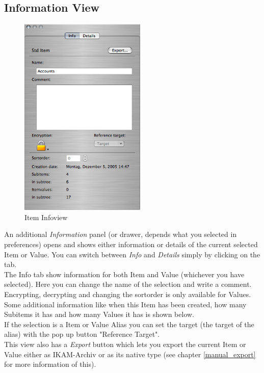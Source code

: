 \documentclass[12pt,a4]{article}
\begin{document}
\subsection{Information View}
\label{gui_information}
\medskip
% 
\begin{figure}[ht]
\begin{center}
\includegraphics[width=6.0cm]{images/Item_InfoView.png}
\end{center}
\caption{Item Infoview}
\label{image:iteminfoview}
\end{figure}
\noindent
%
An additional \textit{Information} panel (or drawer, depends what you selected in preferences) opens and shows either information or details of the current selected Item or Value. You can switch between \textit{Info} and \textit{Details} simply by clicking on the tab. \\
The Info tab show information for both Item and Value (whichever you have selected). Here you can change the name of the selection and write a comment. Encrypting, decrypting and changing the sortorder is only available for Values. \\
Some additional information like when this Item has been created, how many Subitems it has and how many Values it has is shown below. \\
If the selection is a Item or Value Alias you can set the target (the target of the alias) with the pop up button "Reference Target". \\
This view also has a \textit{Export} button which lets you export the current Item or Value either as IKAM-Archiv or as its native type (see chapter \ref{manual_export} for more information of this).
\end{document}
